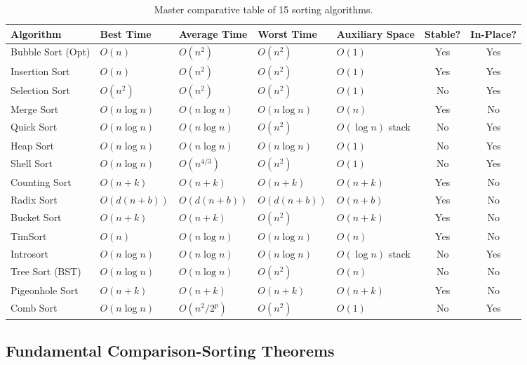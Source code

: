 \begin{table}[htbp]
\centering
\footnotesize
\begin{tabularx}{\textwidth}{p{3.2cm} p{1.8cm} p{1.8cm} p{1.8cm} p{2.6cm} c c}
\toprule
\textbf{Algorithm} & \textbf{Best Time} & \textbf{Average Time} & \textbf{Worst Time} & \textbf{Auxiliary Space} & \textbf{Stable?} & \textbf{In-Place?} \\
\midrule
Bubble Sort (Opt) & $O(n)$ & $O(n^2)$ & $O(n^2)$ & $O(1)$ & Yes & Yes \\
Insertion Sort    & $O(n)$ & $O(n^2)$ & $O(n^2)$ & $O(1)$ & Yes & Yes \\
Selection Sort    & $O(n^2)$ & $O(n^2)$ & $O(n^2)$ & $O(1)$ & No & Yes \\
Merge Sort        & $O(n \log n)$ & $O(n \log n)$ & $O(n \log n)$ & $O(n)$ & Yes & No \\
Quick Sort        & $O(n \log n)$ & $O(n \log n)$ & $O(n^2)$ & $O(\log n)$ stack & No & Yes \\
Heap Sort         & $O(n \log n)$ & $O(n \log n)$ & $O(n \log n)$ & $O(1)$ & No & Yes \\
Shell Sort        & $O(n \log n)$ & $O(n^{4/3})$ & $O(n^2)$ & $O(1)$ & No & Yes \\
Counting Sort     & $O(n + k)$ & $O(n + k)$ & $O(n + k)$ & $O(n + k)$ & Yes & No \\
Radix Sort        & $O(d(n + b))$ & $O(d(n + b))$ & $O(d(n + b))$ & $O(n + b)$ & Yes & No \\
Bucket Sort       & $O(n + k)$ & $O(n + k)$ & $O(n^2)$ & $O(n + k)$ & Yes & No \\
TimSort           & $O(n)$ & $O(n \log n)$ & $O(n \log n)$ & $O(n)$ & Yes & No \\
Introsort         & $O(n \log n)$ & $O(n \log n)$ & $O(n \log n)$ & $O(\log n)$ stack & No & Yes \\
Tree Sort (BST)   & $O(n \log n)$ & $O(n \log n)$ & $O(n^2)$ & $O(n)$ & No & No \\
Pigeonhole Sort   & $O(n + k)$ & $O(n + k)$ & $O(n + k)$ & $O(n + k)$ & Yes & No \\
Comb Sort         & $O(n \log n)$ & $O(n^2 / 2^p)$ & $O(n^2)$ & $O(1)$ & No & Yes \\
\bottomrule
\end{tabularx}
\caption{Master comparative table of 15 sorting algorithms.}
\end{table}

\subsection{Fundamental Comparison-Sorting Theorems}

